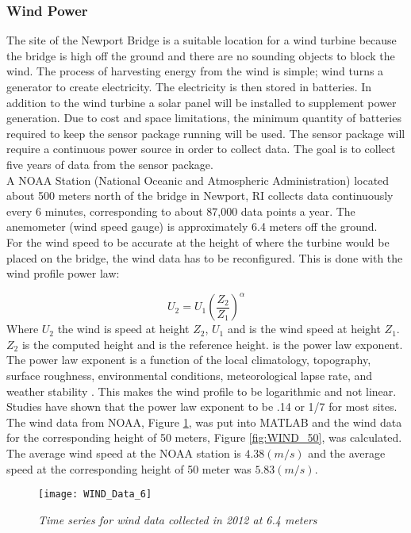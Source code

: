 \subsubsection{Wind Power}
\indent The site of the Newport Bridge is a suitable location for a wind turbine because the bridge is high off the ground and there are no sounding objects to block the wind. The process of harvesting energy from the wind is simple; wind turns a generator to create electricity. The electricity is then stored in batteries. In addition to the wind turbine a solar panel will be installed to supplement power generation. Due to cost and space limitations, the minimum quantity of batteries required to keep the sensor package running will be used. The sensor package will require a continuous power source in order to collect data. The goal is to collect five years of data from the sensor package. \\   
\indent A NOAA Station  (National Oceanic and Atmospheric Administration) located about 500 meters north of the bridge in Newport, RI collects data continuously every 6 minutes, corresponding to about 87,000 data points a year. The anemometer (wind speed gauge) is approximately 6.4 meters off the ground. \\
\indent For the wind speed to be accurate at the height of where the turbine would be placed on the bridge, the wind data has to be reconfigured. This is done with the wind profile power law: 

\begin{equation}
U_{2} = U_{1}(\frac{Z_{2}}{Z_{1}})^\alpha
\label{eqn:WIND_Power_Law}
\end{equation}
Where $U_{2}$ the wind is speed at height $Z_{2}$, $U_{1}$ and is the wind speed at height $Z_{1}$. $Z_{2}$ is the computed height and is the reference height. is the power law exponent. The power law exponent is a function of the local climatology, topography, surface roughness, environmental conditions, meteorological lapse rate, and weather stability \cite{Zekai}. This makes the wind profile to be logarithmic and not linear. Studies have shown that the power law exponent to be .14 or 1/7 for most sites. The wind data from NOAA, Figure \ref{fig:WIND_6.4}, was put into MATLAB and the wind data for the corresponding height of 50 meters, Figure \ref{fig:WIND_50}, was calculated. The average wind speed at the NOAA station is $4.38 (m/s)$ and the average speed at the corresponding height of 50 meter was $5.83(m/s)$.

\begin{figure}[H]
\centering
\texttt{[image: WIND\_Data\_6]}
\caption{\textit{Time series for wind data collected in 2012 at 6.4 meters}}
\label{fig:WIND_6.4}
\end{figure}

